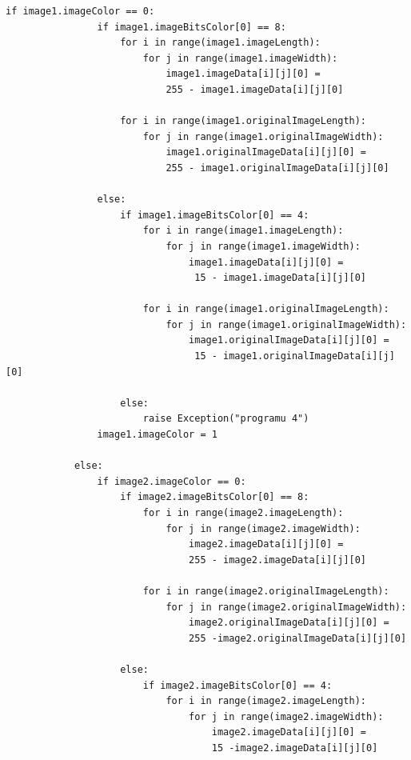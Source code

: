 \documentclass[magisterska,openany]{pracadypl}
\begin{document}
\begin{lstlisting}[caption={Rozdzielczościowe ujednolicanie obrazów szarych}]
            if image1.imageColor == 0:
                if image1.imageBitsColor[0] == 8:
                    for i in range(image1.imageLength):
                        for j in range(image1.imageWidth):
                            image1.imageData[i][j][0] = 
                            255 - image1.imageData[i][j][0]

                    for i in range(image1.originalImageLength):
                        for j in range(image1.originalImageWidth):
                            image1.originalImageData[i][j][0] = 
                            255 - image1.originalImageData[i][j][0]

                else:
                    if image1.imageBitsColor[0] == 4:
                        for i in range(image1.imageLength):
                            for j in range(image1.imageWidth):
                                image1.imageData[i][j][0] =
                                 15 - image1.imageData[i][j][0]

                        for i in range(image1.originalImageLength):
                            for j in range(image1.originalImageWidth):
                                image1.originalImageData[i][j][0] =
                                 15 - image1.originalImageData[i][j][0]

                    else:
                        raise Exception("programu 4")
                image1.imageColor = 1

            else:
                if image2.imageColor == 0:
                    if image2.imageBitsColor[0] == 8:
                        for i in range(image2.imageLength):
                            for j in range(image2.imageWidth):
                                image2.imageData[i][j][0] =
                                255 - image2.imageData[i][j][0]

                        for i in range(image2.originalImageLength):
                            for j in range(image2.originalImageWidth):
                                image2.originalImageData[i][j][0] =
                                255 -image2.originalImageData[i][j][0]

                    else:
                        if image2.imageBitsColor[0] == 4:
                            for i in range(image2.imageLength):
                                for j in range(image2.imageWidth):
                                    image2.imageData[i][j][0] = 
                                    15 -image2.imageData[i][j][0]


\end{lstlisting}
\end{document}
